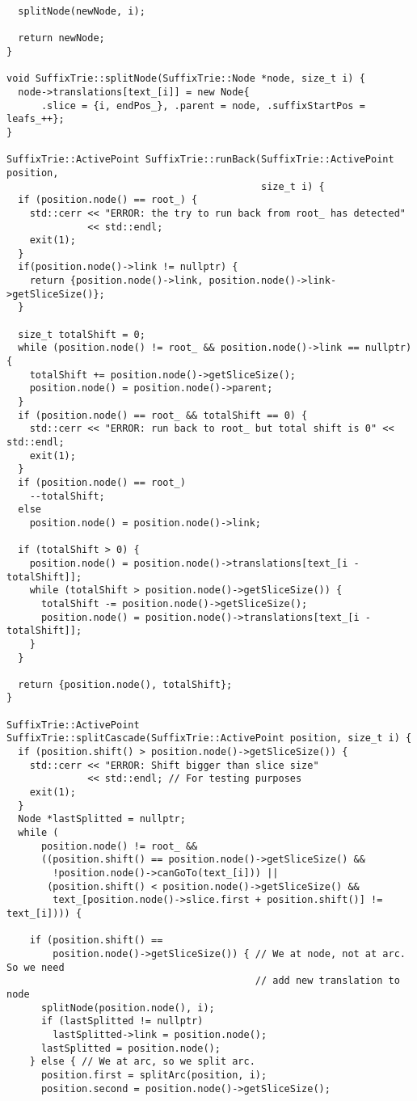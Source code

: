 \begin{verbatim}
  splitNode(newNode, i);

  return newNode;
}

void SuffixTrie::splitNode(SuffixTrie::Node *node, size_t i) {
  node->translations[text_[i]] = new Node{
      .slice = {i, endPos_}, .parent = node, .suffixStartPos = leafs_++};
}

SuffixTrie::ActivePoint SuffixTrie::runBack(SuffixTrie::ActivePoint position,
                                            size_t i) {
  if (position.node() == root_) {
    std::cerr << "ERROR: the try to run back from root_ has detected"
              << std::endl;
    exit(1);
  }
  if(position.node()->link != nullptr) {
    return {position.node()->link, position.node()->link->getSliceSize()};
  }

  size_t totalShift = 0;
  while (position.node() != root_ && position.node()->link == nullptr) {
    totalShift += position.node()->getSliceSize();
    position.node() = position.node()->parent;
  }
  if (position.node() == root_ && totalShift == 0) {
    std::cerr << "ERROR: run back to root_ but total shift is 0" << std::endl;
    exit(1);
  }
  if (position.node() == root_)
    --totalShift;
  else
    position.node() = position.node()->link;

  if (totalShift > 0) {
    position.node() = position.node()->translations[text_[i - totalShift]];
    while (totalShift > position.node()->getSliceSize()) {
      totalShift -= position.node()->getSliceSize();
      position.node() = position.node()->translations[text_[i - totalShift]];
    }
  }

  return {position.node(), totalShift};
}

SuffixTrie::ActivePoint
SuffixTrie::splitCascade(SuffixTrie::ActivePoint position, size_t i) {
  if (position.shift() > position.node()->getSliceSize()) {
    std::cerr << "ERROR: Shift bigger than slice size"
              << std::endl; // For testing purposes
    exit(1);
  }
  Node *lastSplitted = nullptr;
  while (
      position.node() != root_ &&
      ((position.shift() == position.node()->getSliceSize() &&
        !position.node()->canGoTo(text_[i])) ||
       (position.shift() < position.node()->getSliceSize() &&
        text_[position.node()->slice.first + position.shift()] != text_[i]))) {

    if (position.shift() ==
        position.node()->getSliceSize()) { // We at node, not at arc. So we need
                                           // add new translation to node
      splitNode(position.node(), i);
      if (lastSplitted != nullptr)
        lastSplitted->link = position.node();
      lastSplitted = position.node();
    } else { // We at arc, so we split arc.
      position.first = splitArc(position, i);
      position.second = position.node()->getSliceSize();


\end{verbatim}
